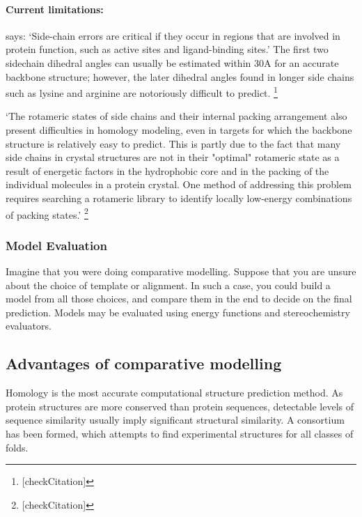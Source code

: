 \documentclass[10pt]{report}
\begin{document}
\paragraph{Current limitations:} \cite{marti-renom2000com} says: `Side-chain errors are critical if they occur in regions that are involved in protein function, such as active sites and ligand-binding sites.' The first two sidechain dihedral angles can usually be estimated within 30A for an accurate backbone structure; however, the later dihedral angles found in longer side chains such as lysine and arginine are notoriously difficult to predict. \cite{wikipedia-homology07} \footnote{[checkCitation]}

`The rotameric states of side chains and their internal packing arrangement also present difficulties in homology modeling, even in targets for which the backbone structure is relatively easy to predict. This is partly due to the fact that many side chains in crystal structures are not in their "optimal" rotameric state as a result of energetic factors in the hydrophobic core and in the packing of the individual molecules in a protein crystal. One method of addressing this problem requires searching a rotameric library to identify locally low-energy combinations of packing states.' \cite{wikipedia-homology07} \footnote{[checkCitation]}

\subsubsection{Model Evaluation}

Imagine that you were doing comparative modelling. Suppose that you are unsure about the choice of template or alignment. In such a case, you could build a model from all those choices, and compare them in the end to decide on the final prediction. Models may be evaluated using energy functions and stereochemistry evaluators. \cite{marti-renom2000com}

\subsection{Advantages of comparative modelling}
Homology is the most accurate computational structure prediction method. \cite{moult05} As protein structures are more conserved than protein sequences, detectable levels of sequence similarity usually imply significant structural similarity. A consortium has been formed, which attempts to find experimental structures for all classes of folds. \cite{williamson07}
\end{document}
